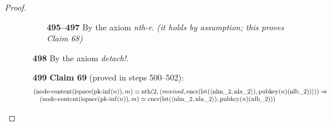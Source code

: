 \documentclass[11pt]{article}
\theoremstyle{plain}
\begin{document}
\begin{proof}
\begin{itemize}[leftmargin=2.8em, itemsep=4pt, parsep=1pt]
\begin{itemize}[leftmargin=2.8em, itemsep=4pt, parsep=1pt]
  \begin{itemize}[leftmargin=2.8em, itemsep=4pt, parsep=1pt]
  \item[\textbf{495--497}] By the axiom \emph{nth-r}.  \emph{(it holds by assumption; this proves Claim 68)}
  \end{itemize}
  \item[\textbf{498}] By the axiom \emph{detach!}.
  \item[\textbf{499}] \textbf{Claim 69} (proved in steps 500--502):
\begin{equation*}
\begin{array}{@{}l@{}} (\operatorname{node\text{-}content}(\operatorname{ispace}(\operatorname{pk\text{-}inf}(n)), m) \simeq \operatorname{nth}(2, \langle \mathit{received}, \operatorname{encr}(\operatorname{lst}(\langle \operatorname{nlm\_2}, \operatorname{nla\_2} \rangle), \operatorname{pubkey}(n)(\operatorname{nlb\_2})) \rangle)) \Rightarrow \\ \quad (\operatorname{node\text{-}content}(\operatorname{ispace}(\operatorname{pk\text{-}inf}(n)), m) \simeq \operatorname{encr}(\operatorname{lst}(\langle \operatorname{nlm\_2}, \operatorname{nla\_2} \rangle), \operatorname{pubkey}(n)(\operatorname{nlb\_2}))) \end{array}
\end{equation*}


\end{itemize}
\end{itemize}
\end{proof}
\end{document}
